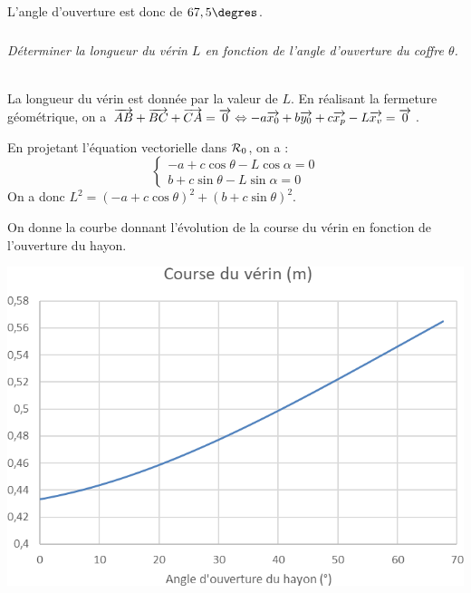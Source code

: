 \documentclass[10pt,fleqn]{article} %
\begin{document}
\begin{multicols}{2}
\begin{corrige}
L'angle d'ouverture est donc de $67,5\degres$.

\end{corrige}
\else
\fi


\subparagraph{}
\textit{Déterminer la longueur du vérin $L$ en fonction de l’angle d’ouverture du coffre $\theta$.}
\ifprof
\begin{corrige}~\\
La longueur du vérin est donnée par la valeur de $L$. En réalisant la fermeture géométrique, on a $\overrightarrow{AB}+\overrightarrow{BC}+\overrightarrow{CA}=\overrightarrow{0} \Leftrightarrow 
-a\overrightarrow{x_0}+b\overrightarrow{y_0} + c\overrightarrow{x_p} -L\overrightarrow{x_v} =\overrightarrow{0}$.

En projetant l'équation vectorielle dans $\mathcal{R}_{0}$, on a : 
$$
\left\{ 
\begin{array}{l}
-a + c\cos\theta -L\cos\alpha ={0} \\
b + c\sin\theta -L\sin\alpha ={0}
\end{array}
\right.
$$
On a donc $L^2 =\left(-a + c\cos\theta \right)^2 + \left(b + c\sin\theta \right)^2  $.

\end{corrige}
\else
\fi

On donne la courbe donnant l'évolution de la course du vérin en fonction de l'ouverture du hayon. 
\begin{center}
\includegraphics[width=\linewidth]{images/cor_02}
\end{center}



\end{multicols}
\end{document}
